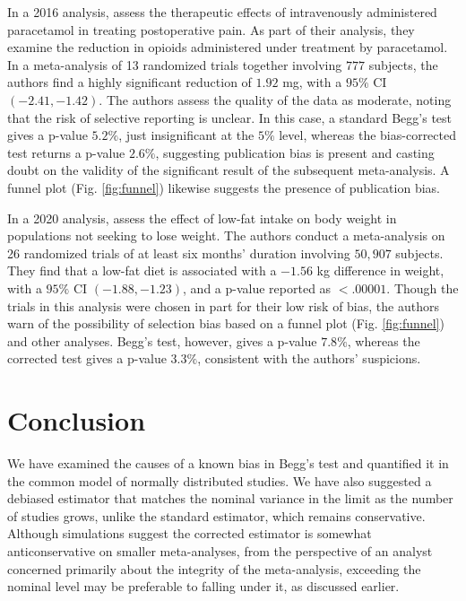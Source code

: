 \documentclass[12pt]{article}
\newcommand{\comment}[1]{
  \iftoggle{commenttoggle}{
    {\normalsize{\color{red}{ #1}}\normalsize}
  }
  {}
}
\begin{document}
    In a 2016 analysis, \citet{mcnicol2016} assess the therapeutic
    effects of intravenously administered paracetamol in treating
    postoperative pain. As part of their analysis, they examine the
    reduction in opioids administered under treatment by
    paracetamol. In a meta-analysis of 13 randomized trials together
    involving $777$ subjects, the authors find a highly significant
    reduction of $1.92$ mg, with a $95\%$ CI $(-2.41,-1.42)$. The
    authors assess the quality of the data as moderate, noting that
    the risk of selective reporting is unclear. In this case, a
    standard Begg's test gives a p-value $5.2\%$, just insignificant
    at the $5\%$ level, whereas the bias-corrected test returns a
    p-value $2.6\%$, suggesting publication bias is present and
    casting doubt on the validity of the significant result of the
    subsequent meta-analysis. A funnel plot (Fig. \ref{fig:funnel})
    likewise suggests the presence of publication bias.
    
    In a 2020 analysis, \citet{hooper2020} assess the effect of low-fat
    intake on body weight in populations not seeking to lose
    weight. The authors conduct a meta-analysis on 26 randomized
    trials of at least six months' duration involving $50,907$
    subjects. They find that a low-fat diet is associated with a
    $-1.56$ kg difference in weight, with a $95\%$ CI $(-1.88,-1.23)$,
    and a p-value reported as $<.00001$. Though the trials in this
    analysis were chosen in part for their low risk of bias,
    the authors warn of the possibility of selection bias based on a
    funnel plot (Fig. \ref{fig:funnel}) and other analyses. Begg's test, however, gives a
    p-value $7.8\%$, whereas the corrected test gives a p-value
    $3.3\%$, consistent with the authors' suspicions.

    
    
\section{Conclusion}

  We have examined the causes of a known bias in Begg's test and
  quantified it in the common model of normally distributed
  studies. We have also suggested a debiased estimator that matches
  the nominal variance in the limit as the number of studies grows,
  unlike the standard estimator, which remains conservative. Although
  simulations suggest the corrected estimator is somewhat anticonservative on
  smaller meta-analyses, from the perspective of an analyst
  concerned primarily about the integrity of the meta-analysis,
  exceeding the nominal level may be preferable to falling under it,
  as discussed earlier.  %
\end{document}
